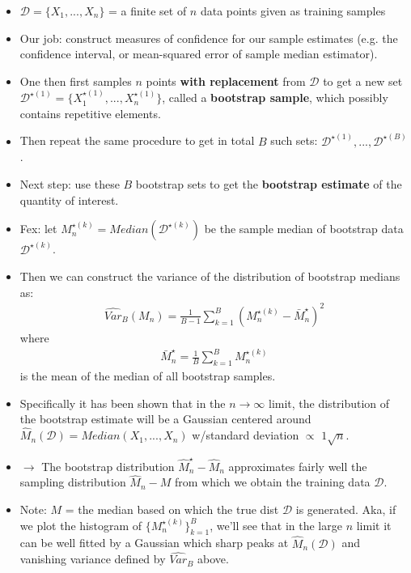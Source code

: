 \documentclass[norsk,a4paper,11pt]{article}
\begin{document}
\begin{itemize}
	\item $\mathcal{D} = \{ X_1, ..., X_n \}$ = a finite set of $n$ data points given as training samples
	\item Our job: construct measures of confidence for our sample estimates (e.g. the confidence interval, or mean-squared error of sample median estimator).
	\item One then first samples $n$ points \textbf{with replacement} from $\mathcal{D}$ to get a new set $\mathcal{D}^{\star (1)} = \{ X_1^{\star (1)}, ...,  X_n^{\star (1)} \}$, called a \textbf{bootstrap sample}, which possibly contains repetitive elements.
	\item Then repeat the same procedure to get in total $B$ such sets:
	$\mathcal{D}^{\star (1)}, ..., \mathcal{D}^{\star (B)}$.
	\item Next step: use these $B$ bootstrap sets to get the \textbf{bootstrap estimate} of the quantity of interest.
	\item Fex: let $M_n^{\star (k)} = Median(\mathcal{D}^{\star (k)})$ be the sample median of bootstrap data $\mathcal{D}^{\star (k)}$.
	\item Then we can construct the variance of the distribution of bootstrap medians as:
	\begin{align}
		\hat{Var}_B (M_n) = \frac{1}{B-1} \sum_{k=1}^B (M_n^{\star (k)}-\bar{M}_n^\star )^2
	\end{align}
	where
	\begin{align}
		\bar{M}_n^\star = \frac{1}{B} \sum_{k=1}^B M_n^{\star (k)}
	\end{align}
	is the mean of the median of all bootstrap samples.
	\item Specifically it has been shown that in the $n\rightarrow \infty$ limit, the distribution of the bootstrap estimate will be a Gaussian centered around $\hat{M}_n (\mathcal{D}) = Median (X_1, ..., X_n)$ w/standard deviation $\propto$ $1\sqrt{n}$.
	\item $\rightarrow$ The bootstrap distribution $\hat{M}_n^\star - \hat{M}_n$ approximates fairly well the sampling distribution $\hat{M}_n - M$ from which we obtain the training data $\mathcal{D}$. 
	\item Note: $M$ = the median based on which the true dist $\mathcal{D}$ is generated. Aka, if we plot the histogram of $\{ M_n^{\star (k)} \}_{k=1}^B$, we'll see that in the large $n$ limit it can be well fitted by a Gaussian which sharp peaks at $\hat{M}_n (\mathcal{D})$ and vanishing variance defined by $\hat{Var}_B$ above.

\end{itemize}
\end{document}
